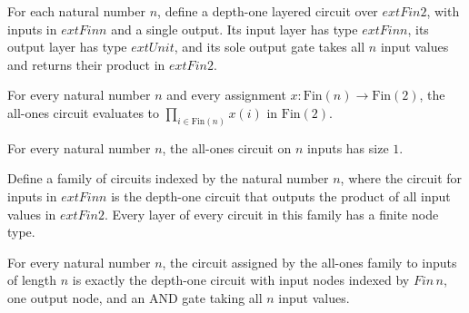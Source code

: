 \begin{definition}
\label{BoolCircuit.allOnesCircuit}
\leanok
{}
For each natural number $n$, define a depth-one layered circuit over $	ext{Fin }2$, with
inputs in $	ext{Fin }n$ and a single output. Its input layer has type $	ext{Fin }n$, its
output layer has type $	ext{Unit}$, and its sole output gate takes all $n$ input values
and returns their product in $	ext{Fin }2$.
\end{definition}

\begin{theorem}
\leanok
{}
For every natural number $n$ and every assignment $x :
\mathrm{Fin}(n)\to\mathrm{Fin}(2)$, the all-ones circuit evaluates to
$\prod_{i\in\mathrm{Fin}(n)}x(i)$ in $\mathrm{Fin}(2)$.
\end{theorem}

\begin{theorem}
\label{BoolCircuit.allOnesCircuit_size}
\leanok
{}
For every natural number $n$, the all-ones circuit on $n$ inputs has size $1$.
\end{theorem}

\begin{definition}
\label{BoolCircuit.allOnesFamily}
\leanok
{}
Define a family of circuits indexed by the natural number $n$, where the circuit for
inputs in $	ext{Fin }n$ is the depth-one circuit that outputs the product of all input
values in $	ext{Fin }2$. Every layer of every circuit in this family has a finite node
type.
\end{definition}

\begin{theorem}
\label{BoolCircuit.allOnesFamily_circuit}
\leanok
{}
For every natural number $n$, the circuit assigned by the all-ones family to inputs of
length $n$ is exactly the depth-one circuit with input nodes indexed by
$Fin\,n$, one output node, and an AND gate taking all $n$ input values.
\end{theorem}

